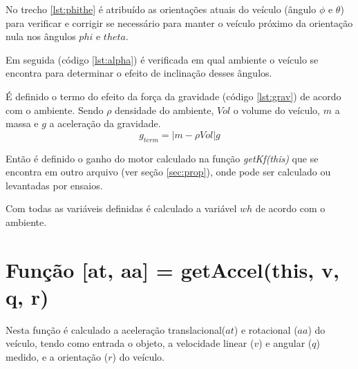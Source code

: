 No trecho \ref{lst:phithe} é atribuído as orientações atuais do veículo (ângulo $\phi$ e $\theta$) para verificar e corrigir se necessário para manter o veículo próximo da orientação nula nos ângulos $phi$ e $theta$.


Em seguida (código \ref{lst:alpha}) é verificada em qual ambiente o veículo se encontra para determinar o efeito de inclinação desses ângulos.


É definido o termo do efeito da força da gravidade (código \ref{lst:grav}) de acordo com o ambiente. Sendo $\rho$ densidade do ambiente, $Vol$ o volume do veículo, $m$ a massa e $g$ a aceleração da gravidade.
\begin{equation}
    g_{term} = |m - \rho Vol| g
\end{equation}


Então é definido o ganho do motor calculado na função \textit{getKf(this)} que se encontra em outro arquivo (ver seção \ref{sec:prop}), onde pode ser calculado ou levantadas por ensaios.


Com todas as variáveis definidas é calculado a variável $wh$ de acordo com o ambiente.


\section{Função  [at, aa] = getAccel(this, v, q, r)}
\label{sec:getAccel}
Nesta função é calculado a aceleração translacional($at$) e rotacional ($aa$) do veículo, tendo como entrada o objeto, a velocidade linear ($v$) e angular ($q$) medido, e a orientação ($r$) do veículo. 

